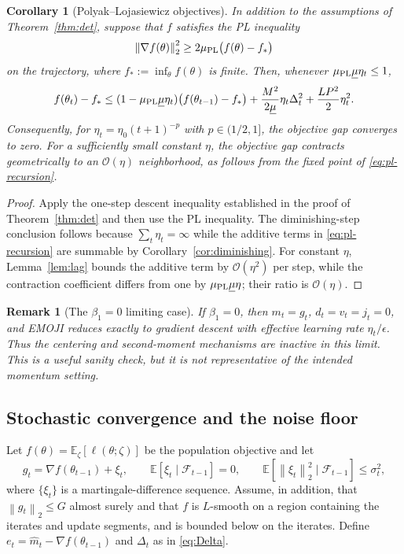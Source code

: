 \documentclass[11pt]{article}
\newtheorem{corollary}[theorem]{Corollary}
\newtheorem{remark}[theorem]{Remark}
\newcommand{\E}{\mathbb{E}}
\newcommand{\norm}[1]{\left\lVert #1\right\rVert}
\newcommand{\cO}{\mathcal{O}}
\begin{document}
\begin{corollary}[Polyak--Lojasiewicz objectives]\label{cor:pl}
In addition to the assumptions of Theorem~\ref{thm:det}, suppose that $f$ satisfies the PL inequality
\[
 \norm{\nabla f(\theta)}_2^2\ge2\mu_{\rm PL}\bigl(f(\theta)-f_*\bigr)
\]
on the trajectory, where $f_*:=\inf_{\theta}f(\theta)$ is finite. Then, whenever $\mu_{\rm PL}\underline\mu\eta_t\le1$,
\begin{equation}
 f(\theta_t)-f_*
 \le(1-\mu_{\rm PL}\underline\mu\eta_t)\bigl(f(\theta_{t-1})-f_*\bigr)
 +\frac{M^2}{2\underline\mu}\eta_t\Delta_t^2
 +\frac{LP^2}{2}\eta_t^2.
 \label{eq:pl-recursion}
\end{equation}
Consequently, for $\eta_t=\eta_0(t+1)^{-p}$ with $p\in(1/2,1]$, the objective gap converges to zero. For a sufficiently small constant $\eta$, the objective gap contracts geometrically to an $\cO(\eta)$ neighborhood, as follows from the fixed point of \eqref{eq:pl-recursion}.
\end{corollary}

\begin{proof}
Apply the one-step descent inequality established in the proof of Theorem~\ref{thm:det} and then use the PL inequality. The diminishing-step conclusion follows because $\sum_t\eta_t=\infty$ while the additive terms in \eqref{eq:pl-recursion} are summable by Corollary~\ref{cor:diminishing}. For constant $\eta$, Lemma~\ref{lem:lag} bounds the additive term by $\cO(\eta^2)$ per step, while the contraction coefficient differs from one by $\mu_{\rm PL}\underline\mu\eta$; their ratio is $\cO(\eta)$.
\end{proof}

\begin{remark}[The $\beta_1=0$ limiting case]
If $\beta_1=0$, then $m_t=g_t$, $d_t=v_t=j_t=0$, and EMOJI reduces exactly to gradient descent with effective learning rate $\eta_t/\epsilon$. Thus the centering and second-moment mechanisms are inactive in this limit. This is a useful sanity check, but it is not representative of the intended momentum setting.
\end{remark}

\subsection{Stochastic convergence and the noise floor}
Let $f(\theta)=\E_\zeta[\ell(\theta;\zeta)]$ be the population objective and let
\[
 g_t=\nabla f(\theta_{t-1})+\xi_t,
 \qquad \E[\xi_t\mid\mathcal F_{t-1}]=0,
 \qquad \E[\norm{\xi_t}_2^2\mid\mathcal F_{t-1}]\le\sigma_t^2,
\]
where $\{\xi_t\}$ is a martingale-difference sequence. Assume, in addition, that $\norm{g_t}_2\le G$ almost surely and that $f$ is $L$-smooth on a region containing the iterates and update segments, and is bounded below on the iterates. Define $e_t=\widehat m_t-\nabla f(\theta_{t-1})$ and $\Delta_t$ as in \eqref{eq:Delta}.
\end{document}
